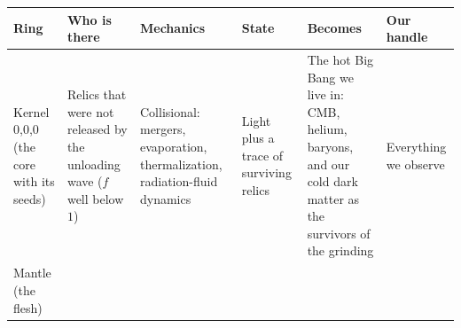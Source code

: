 \documentclass[
  11pt,
]{article}
\begin{document}
\begin{longtable}[]{@{}llllll@{}}
\toprule
\begin{minipage}[b]{0.14\columnwidth}\raggedright
Ring\strut
\end{minipage} & \begin{minipage}[b]{0.14\columnwidth}\raggedright
Who is there\strut
\end{minipage} & \begin{minipage}[b]{0.14\columnwidth}\raggedright
Mechanics\strut
\end{minipage} & \begin{minipage}[b]{0.14\columnwidth}\raggedright
State\strut
\end{minipage} & \begin{minipage}[b]{0.14\columnwidth}\raggedright
Becomes\strut
\end{minipage} & \begin{minipage}[b]{0.14\columnwidth}\raggedright
Our handle\strut
\end{minipage}\tabularnewline
\midrule
\endhead
\begin{minipage}[t]{0.14\columnwidth}\raggedright
Kernel 0,0,0 (the core with its seeds)\strut
\end{minipage} & \begin{minipage}[t]{0.14\columnwidth}\raggedright
Relics that were not released by the unloading wave (\(f\) well below
\(1\))\strut
\end{minipage} & \begin{minipage}[t]{0.14\columnwidth}\raggedright
Collisional: mergers, evaporation, thermalization, radiation-fluid
dynamics\strut
\end{minipage} & \begin{minipage}[t]{0.14\columnwidth}\raggedright
Light plus a trace of surviving relics\strut
\end{minipage} & \begin{minipage}[t]{0.14\columnwidth}\raggedright
The hot Big Bang we live in: CMB, helium, baryons, and our cold dark
matter as the survivors of the grinding\strut
\end{minipage} & \begin{minipage}[t]{0.14\columnwidth}\raggedright
Everything we observe\strut
\end{minipage}\tabularnewline
\begin{minipage}[t]{0.14\columnwidth}\raggedright
Mantle (the flesh)\strut
\end{minipage} & \begin{minipage}[t]{0.14\columnwidth}\raggedright

\end{minipage}
\end{longtable}
\end{document}
